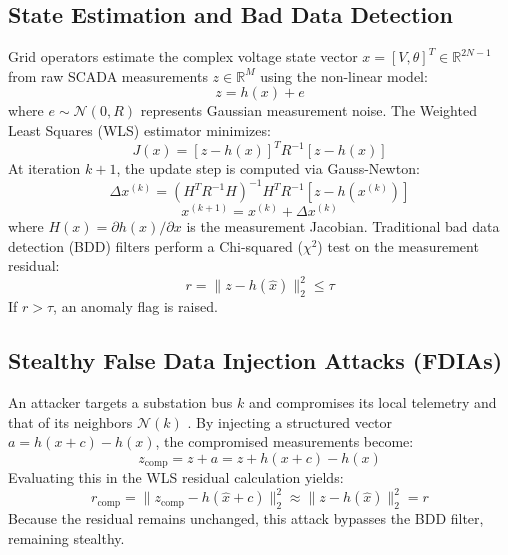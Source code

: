 \documentclass[conference]{IEEEtran}
\begin{document}
\subsection{State Estimation and Bad Data Detection}
Grid operators estimate the complex voltage state vector $x = [V, \theta]^T \in \mathbb{R}^{2N-1}$ from raw SCADA measurements $z \in \mathbb{R}^M$ using the non-linear model:
\begin{equation}
z = h(x) + e
\end{equation}
where $e \sim \mathcal{N}(0, R)$ represents Gaussian measurement noise. The Weighted Least Squares (WLS) estimator minimizes:
\begin{equation}
J(x) = [z - h(x)]^T R^{-1} [z - h(x)]
\end{equation}
At iteration $k+1$, the update step is computed via Gauss-Newton:
\begin{equation}
\Delta x^{(k)} = \left( H^T R^{-1} H \right)^{-1} H^T R^{-1} [z - h(x^{(k)})]
\end{equation}
\begin{equation}
x^{(k+1)} = x^{(k)} + \Delta x^{(k)}
\end{equation}
where $H(x) = \partial h(x) / \partial x$ is the measurement Jacobian. Traditional bad data detection (BDD) filters perform a Chi-squared ($\chi^2$) test on the measurement residual:
\begin{equation}
r = \|z - h(\hat{x})\|_2^2 \le \tau
\end{equation}
If $r > \tau$, an anomaly flag is raised.

\subsection{Stealthy False Data Injection Attacks (FDIAs)}
An attacker targets a substation bus $k$ and compromises its local telemetry and that of its neighbors $\mathcal{N}(k)$ \cite{b11}. By injecting a structured vector $a = h(x+c) - h(x)$, the compromised measurements become:
\begin{equation}
z_{\text{comp}} = z + a = z + h(x + c) - h(x)
\end{equation}
Evaluating this in the WLS residual calculation yields:
\begin{equation}
r_{\text{comp}} = \|z_{\text{comp}} - h(\hat{x} + c)\|_2^2 \approx \|z - h(\hat{x})\|_2^2 = r
\end{equation}
Because the residual remains unchanged, this attack bypasses the BDD filter, remaining stealthy.
\end{document}
